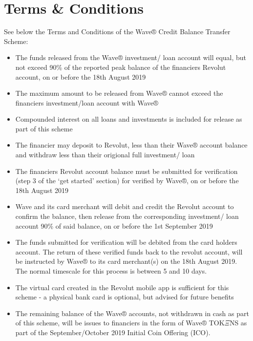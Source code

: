 \documentclass[letterpaper,10pt,openany,oneside,english]{sphinxmanual}
\begin{document}
\chapter{Terms \& Conditions}
\label{\detokenize{terms:terms-conditions}}\label{\detokenize{terms::doc}}
See below the Terms and Conditions of the Wave® Credit Balance Transfer Scheme:
\begin{itemize}
\item {} 
The funds released from the Wave® investment/ loan account will equal, but not exceed 90\% of the reported peak balance of the financiers Revolut account, on or before the 18th August 2019

\item {} 
The maximum amount to be released from Wave® cannot exceed the financiers investment/loan account with Wave®

\item {} 
Compounded interest on all loans and investments is included for release as part of this scheme

\item {} 
The financier may deposit to Revolut, less than their Wave® account balance and withdraw less than their origional full investment/ loan

\item {} 
The financiers Revolut account balance must be submitted for verification (step 3 of the ‘get started’ section) for verified by Wave®, on or before the 18th August 2019

\item {} 
Wave and its card merchant will debit and credit the Revolut account to confirm the balance, then release from the corresponding investment/ loan account 90\% of said balance, on or before the 1st September 2019

\item {} 
The funds submitted for verification will be debited from the card holders account. The return of these verified funds back to the revolut account, will be instructed by Wave® to its card merchant(s) on the 18th August 2019. The normal timescale for this process is between 5 and 10 days.

\item {} 
The virtual card created in the Revolut mobile app is sufficient for this scheme - a physical bank card is optional, but advised for future benefits

\item {} 
The remaining balance of the Wave® accounts, not withdrawn in cash as part of this scheme, will be issues to financiers in the form of Wave® TOK\(\Xi\)NS as part of the September/October 2019 Initial Coin Offering (ICO).

\end{itemize}
\end{document}
